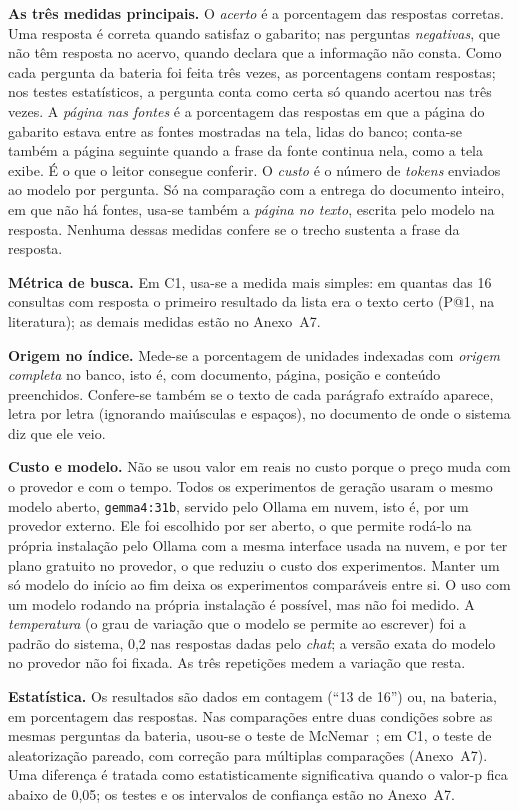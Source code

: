 \documentclass[12pt]{article}
\begin{document}
\textbf{As três medidas principais.} O \emph{acerto} é a porcentagem das respostas corretas. Uma resposta é correta quando satisfaz o gabarito; nas perguntas \emph{negativas}, que não têm resposta no acervo, quando declara que a informação não consta. Como cada pergunta da bateria foi feita três vezes, as porcentagens contam respostas; nos testes estatísticos, a pergunta conta como certa só quando acertou nas três vezes. A \emph{página nas fontes} é a porcentagem das respostas em que a página do gabarito estava entre as fontes mostradas na tela, lidas do banco; conta-se também a página seguinte quando a frase da fonte continua nela, como a tela exibe. É o que o leitor consegue conferir. O \emph{custo} é o número de \emph{tokens} enviados ao modelo por pergunta. Só na comparação com a entrega do documento inteiro, em que não há fontes, usa-se também a \emph{página no texto}, escrita pelo modelo na resposta. Nenhuma dessas medidas confere se o trecho sustenta a frase da resposta.

\textbf{Métrica de busca.} Em C1, usa-se a medida mais simples: em quantas das 16 consultas com resposta o primeiro resultado da lista era o texto certo (P@1, na literatura); as demais medidas estão no Anexo~A7.

\textbf{Origem no índice.} Mede-se a porcentagem de unidades indexadas com \emph{origem completa} no banco, isto é, com documento, página, posição e conteúdo preenchidos. Confere-se também se o texto de cada parágrafo extraído aparece, letra por letra (ignorando maiúsculas e espaços), no documento de onde o sistema diz que ele veio.

\textbf{Custo e modelo.} Não se usou valor em reais no custo porque o preço muda com o provedor e com o tempo. Todos os experimentos de geração usaram o mesmo modelo aberto, \texttt{gemma4:31b}, servido pelo Ollama em nuvem, isto é, por um provedor externo. Ele foi escolhido por ser aberto, o que permite rodá-lo na própria instalação pelo Ollama com a mesma interface usada na nuvem, e por ter plano gratuito no provedor, o que reduziu o custo dos experimentos. Manter um só modelo do início ao fim deixa os experimentos comparáveis entre si. O uso com um modelo rodando na própria instalação é possível, mas não foi medido. A \emph{temperatura} (o grau de variação que o modelo se permite ao escrever) foi a padrão do sistema, 0,2 nas respostas dadas pelo \emph{chat}; a versão exata do modelo no provedor não foi fixada. As três repetições medem a variação que resta.

\textbf{Estatística.} Os resultados são dados em contagem (``13 de 16'') ou, na bateria, em porcentagem das respostas. Nas comparações entre duas condições sobre as mesmas perguntas da bateria, usou-se o teste de McNemar~\cite{mcnemar1947note}; em C1, o teste de aleatorização pareado, com correção para múltiplas comparações (Anexo~A7). Uma diferença é tratada como estatisticamente significativa quando o valor-p fica abaixo de 0,05; os testes e os intervalos de confiança estão no Anexo~A7.
\end{document}
